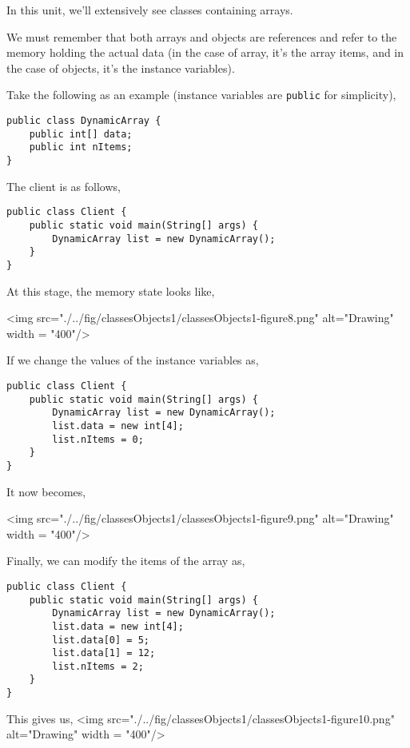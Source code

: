 In this unit, we'll extensively see classes containing arrays. 

We must remember that both arrays and objects are references and refer to the memory holding the actual data (in the case of array, it's the array items, and in the case of objects, it's the instance variables).

Take the following as an example (instance variables are \texttt{public} for simplicity),

\begin{lstlisting}
public class DynamicArray {
	public int[] data;
	public int nItems;
}
\end{lstlisting}

The client is as follows,

\begin{lstlisting}
public class Client {
	public static void main(String[] args) {
		DynamicArray list = new DynamicArray();
	}
}
\end{lstlisting}

At this stage, the memory state looks like,

\vskip 0.5cm
<img src="./../fig/classesObjects1/classesObjects1-figure8.png" alt="Drawing" width = "400"/> 
\vskip 0.5cm
\newpage

If we change the values of the instance variables as,

\begin{lstlisting}
public class Client {
	public static void main(String[] args) {
		DynamicArray list = new DynamicArray();
		list.data = new int[4];
		list.nItems = 0;
	}
}
\end{lstlisting}

It now becomes,

\vskip 0.5cm

<img src="./../fig/classesObjects1/classesObjects1-figure9.png" alt="Drawing" width = "400"/> 
\vskip 0.5cm

Finally, we can modify the items of the array as,

\begin{lstlisting}
public class Client {
	public static void main(String[] args) {
		DynamicArray list = new DynamicArray();
		list.data = new int[4];
		list.data[0] = 5;
		list.data[1] = 12;
		list.nItems = 2;
	}
}
\end{lstlisting}

\newpage
This gives us,
\vskip 0.5cm
<img src="./../fig/classesObjects1/classesObjects1-figure10.png" alt="Drawing" width = "400"/> 

